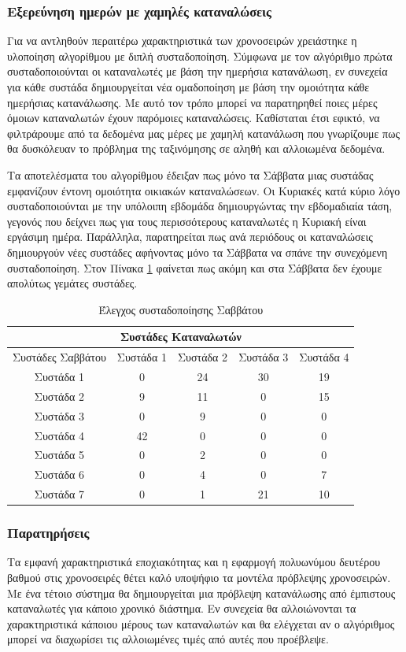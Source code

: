 \subsubsection{Εξερεύνηση ημερών με χαμηλές καταναλώσεις}
Για να αντληθούν περαιτέρω χαρακτηριστικά των χρονοσειρών χρειάστηκε η υλοποίηση αλγορίθμου με διπλή συσταδοποίηση. Σύμφωνα με τον αλγόριθμο πρώτα συσταδοποιούνται οι καταναλωτές με βάση την ημερήσια κατανάλωση, εν συνεχεία για κάθε συστάδα δημιουργείται νέα ομαδοποίηση με βάση την ομοιότητα κάθε ημερήσιας κατανάλωσης. Με αυτό τον τρόπο μπορεί να παρατηρηθεί ποιες μέρες όμοιων καταναλωτών έχουν παρόμοιες καταναλώσεις. Καθίσταται έτσι εφικτό, να φιλτράρουμε από τα δεδομένα μας μέρες με χαμηλή κατανάλωση που γνωρίζουμε πως θα δυσκόλευαν το πρόβλημα της ταξινόμησης σε αληθή και αλλοιωμένα δεδομένα.

Τα αποτελέσματα του αλγορίθμου έδειξαν πως μόνο τα Σάββατα μιας συστάδας εμφανίζουν έντονη ομοιότητα οικιακών καταναλώσεων. Οι Κυριακές κατά κύριο λόγο συσταδοποιούνται με την υπόλοιπη εβδομάδα δημιουργώντας την εβδομαδιαία τάση, γεγονός που δείχνει πως για τους περισσότερους καταναλωτές η Κυριακή είναι εργάσιμη ημέρα. Παράλληλα, παρατηρείται πως ανά περιόδους οι καταναλώσεις δημιουργούν νέες συστάδες αφήνοντας μόνο τα Σάββατα να σπάνε την συνεχόμενη συσταδοποίηση. Στον Πίνακα \ref{tab:double clustering} φαίνεται πως ακόμη και στα Σάββατα δεν έχουμε απολύτως γεμάτες συστάδες.

\begin{table}[ht!]
\centering
\begin{tabular}{ |c||c|c|c|c|  }
 \hline
 \multicolumn{5}{|c|}{Συστάδες Καταναλωτών} \\
 \hline
 Συστάδες Σαββάτου  & Συστάδα 1& Συστάδα 2 &Συστάδα 3 &Συστάδα 4\\
 \hline
 Συστάδα 1 & 0  & 24 & 30 & 19\\
 Συστάδα 2 & 9  & 11 & 0  & 15\\
 Συστάδα 3 & 0  & 9  & 0  & 0\\
 Συστάδα 4 & 42 & 0  & 0  & 0\\
 Συστάδα 5 & 0  & 2  & 0  & 0\\
 Συστάδα 6 & 0  & 4  & 0  & 7\\
 Συστάδα 7 & 0  & 1  & 21 & 10\\
 \hline
\end{tabular}
\caption{Έλεγχος συσταδοποίησης Σαββάτου}
\label{tab:double clustering}
\end{table}

\subsubsection{Παρατηρήσεις}
Τα εμφανή χαρακτηριστικά εποχιακότητας και η εφαρμογή πολυωνύμου δευτέρου βαθμού στις χρονοσειρές θέτει καλό υποψήφιο τα μοντέλα πρόβλεψης χρονοσειρών. Με ένα τέτοιο σύστημα θα δημιουργείται μια πρόβλεψη κατανάλωσης από έμπιστους καταναλωτές για κάποιο χρονικό διάστημα. Εν συνεχεία θα αλλοιώνονται τα χαρακτηριστικά κάποιου μέρους των καταναλωτών και θα ελέγχεται αν ο αλγόριθμος μπορεί να διαχωρίσει τις αλλοιωμένες τιμές από αυτές που προέβλεψε.

